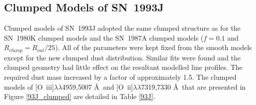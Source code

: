 \subsection{Clumped Models of SN~1993J}

Clumped models of SN~1993J adopted the same clumped structure as for the SN~1980K clumped models and the SN~1987A clumped models ($f=0.1$ and $R_{clump}=R_{out}/25$).  All of the parameters were kept fixed from the smooth models except for the new clumped dust distribution.  Similar fits were found and the clumped geometry had little effect on the resultant modelled line profiles.   The required dust mass increased by a factor of approximately 1.5.  The clumped models of [O~{\sc iii}]$\lambda\lambda$4959,5007 \AA\ and [O~{\sc ii}]$\lambda\lambda$7319,7330 \AA\  that are presented in Figure \ref{93J_clumped} are detailed in Table \ref{93J}. 


